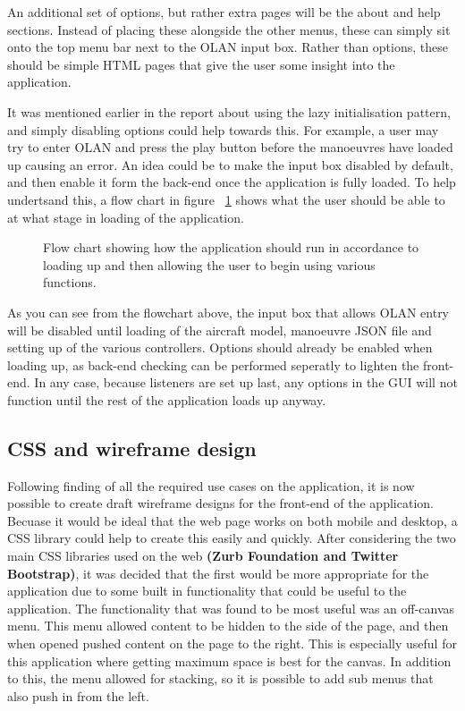 An additional set of options, but rather extra pages will be the about and help sections. Instead of placing these alongside the other menus, these can simply sit onto the top menu bar next to the OLAN input box. Rather than options, these should be simple HTML pages that give the user some insight into the application.

It was mentioned earlier in the report about using the lazy initialisation pattern, and simply disabling options could help towards this. For example, a user may try to enter OLAN and press the play button before the manoeuvres have loaded up causing an error. An idea could be to make the input box disabled by default, and then enable it form the back-end once the application is fully loaded. To help undertsand this, a flow chart in figure ~\ref{fig:flow} shows what the user should be able to at what stage in loading of the application. 

\begin{figure}[h!]
  \centering
  \caption{Flow chart showing how the application should run in accordance to loading up and then allowing the user to begin using various functions.}
  \label{fig:flow}
\end{figure}

As you can see from the flowchart above, the input box that allows OLAN entry will be disabled until loading of the aircraft model, manoeuvre JSON file and setting up of the various controllers. Options should already be enabled when loading up, as back-end checking can be performed seperatly to lighten the front-end. In any case, because listeners are set up last, any options in the GUI will not function until the rest of the application loads up anyway.

\subsection{CSS and wireframe design}
Following finding of all the required use cases on the application, it is now possible to create draft wireframe designs for the front-end of the application. Becuase it would be ideal that the web page works on both mobile and desktop, a CSS library could help to create this easily and quickly. After considering the two main CSS libraries used on the web \textbf{(Zurb Foundation and Twitter Bootstrap)}, it was decided that the first would be more appropriate for the application due to some built in functionality that could be useful to the application. The functionality that was found to be most useful was an off-canvas menu. This menu allowed content to be hidden to the side of the page, and then when opened pushed content on the page to the right. This is especially useful for this application where getting maximum space is best for the canvas. In addition to this, the menu allowed for stacking, so it is possible to add sub menus that also push in from the left. 

